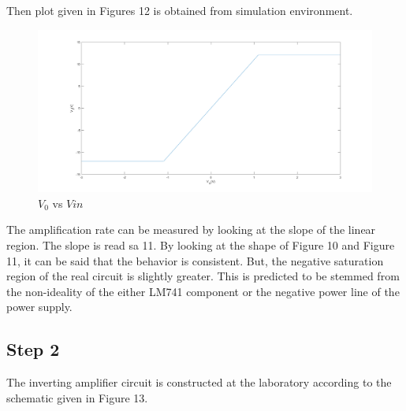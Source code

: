 \documentclass[letterpaper,12pt]{article}
\begin{document}
Then plot given in Figures 12 is obtained from simulation environment.

\begin{figure}[H]
	\centering
   \includegraphics[width=1\textwidth]{3d_vs_vin.png}
   \caption{\(V_0\) vs \(V{in}\)}
\end{figure}
The amplification rate can be measured by looking at the slope of the linear region. The slope is read sa 11. By looking at the shape of Figure 10 and Figure 11, it can be said that the behavior is consistent. But, the negative saturation region of the real circuit is slightly greater. This is predicted to be stemmed from the non-ideality of the either LM741 component or the negative power line of the power supply.
\subsection{Step 2}
The inverting amplifier circuit is constructed at the laboratory according to the schematic given in Figure 13.  
\end{document}
